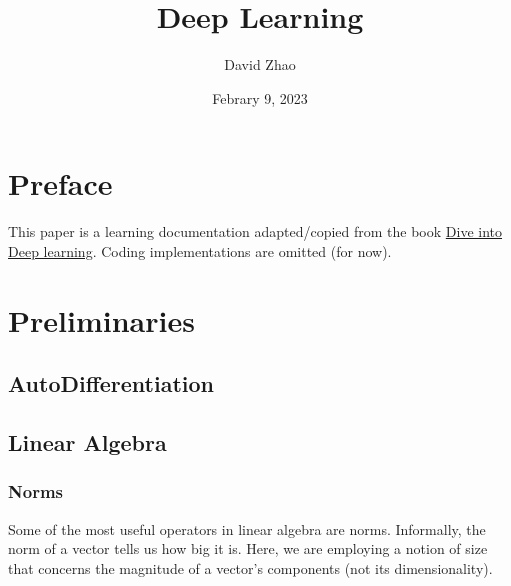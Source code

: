 \documentclass[a4paper,12pt]{article}
\theoremstyle{definition}
\begin{document}
\title{Deep Learning}
\author{David Zhao}
\date{Febrary 9, 2023}
\maketitle

\section{Preface}
This paper is a learning documentation adapted/copied from the book \href{https://d2l.ai/}{Dive into Deep learning}.
Coding implementations are omitted (for now).

\section{Preliminaries}
    \subsection*{AutoDifferentiation}

    \subsection*{Linear Algebra}
    \subsubsection*{Norms}
    Some of the most useful operators in linear algebra are norms. Informally, the norm of a vector tells us how big it is.
    Here, we are employing a notion of size that concerns the magnitude of a vector’s components (not its dimensionality).
\end{document}
